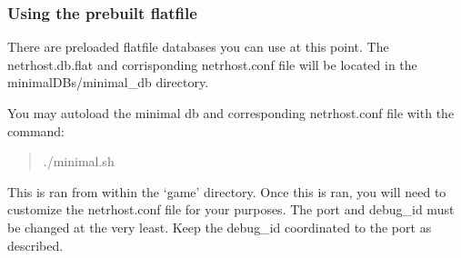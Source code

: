 \documentclass[letterpaper,10pt,english]{sphinxmanual}
\begin{document}
\subsubsection{Using the prebuilt flatfile}
\label{\detokenize{installation:using-the-prebuilt-flatfile}}
\sphinxAtStartPar
There are pre\sphinxhyphen{}loaded flatfile databases you can use at this point.  The netrhost.db.flat
and corrisponding netrhost.conf file will be located in the minimal\sphinxhyphen{}DBs/minimal\_db directory.

\sphinxAtStartPar
You may auto\sphinxhyphen{}load the minimal db and corresponding netrhost.conf file with the
command:
\begin{quote}

\sphinxAtStartPar
./minimal.sh
\end{quote}

\sphinxAtStartPar
This is ran from within the ‘game’ directory.  Once this is ran, you will need
to customize the netrhost.conf file for your purposes.  The port and debug\_id must
be changed at the very least.  Keep the debug\_id coordinated to the port as described.
\end{document}
